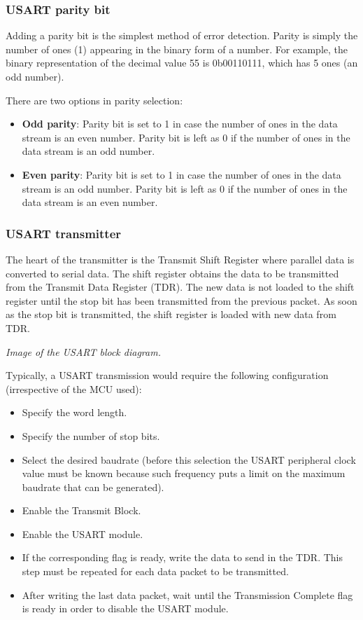 \subsubsection{USART parity bit}
Adding a parity bit is the simplest method of error detection. Parity is simply the number of ones (1) appearing in the binary form of a number. For example, the binary representation of the decimal value 55 is 0b00110111, which has 5 ones (an odd number).

\noindent There are two options in parity selection:

\begin{itemize}
	\item	\textbf{Odd parity}: Parity bit is set to 1 in case the number of ones in the data stream is an even number. Parity bit is left as 0 if the number of ones in the data stream is an odd number.
	\item	\textbf{Even parity}: Parity bit is set to 1 in case the number of ones in the data stream is an odd number. Parity bit is left as 0 if the number of ones in the data stream is an even number.
\end{itemize}

\subsubsection{USART transmitter}
The heart of the transmitter is the Transmit Shift Register where parallel data is converted to serial data. The shift register obtains the data to be transmitted from the Transmit Data Register (TDR). The new data is not loaded to the shift register until the stop bit has been transmitted from the previous packet. As soon as the stop bit is transmitted, the shift register is loaded with new data from TDR.

\begin{center}
\textit{Image of the USART block diagram.}
\end{center}

\noindent Typically, a USART transmission would require the following configuration (irrespective of the MCU used):

\begin{itemize}
	\item	Specify the word length.
	\item	Specify the number of stop bits.
	\item	Select the desired baudrate (before this selection the USART peripheral clock value must be known because such frequency puts a limit on the maximum baudrate that can be generated).
	\item	Enable the Transmit Block.
	\item	Enable the USART module.
	\item	If the corresponding flag is ready, write the data to send in the TDR. This step must be repeated for each data packet to be transmitted.
	\item	After writing the last data packet, wait until the Transmission Complete flag is ready in order to disable the USART module.
\end{itemize}

